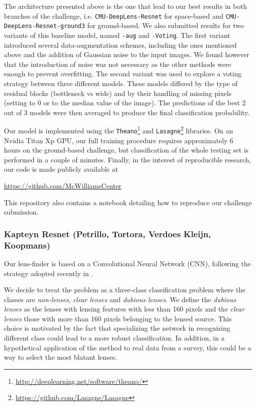 \documentclass[useAMS,usenatbib]{mnras}
\begin{document}
The architecture presented above is the one that lead to our best results in both branches of the challenge, i.e. \texttt{CMU-DeepLens-Resnet} for space-based and \texttt{CMU-DeepLens-Resnet-ground3} for ground-based. We also submitted results for two variants of this baseline model, named \texttt{-aug} and \texttt{-Voting}. 
The first variant introduced several data-augmentation schemes, including the ones mentioned above and the addition of Gaussian noise to the input images. We found however that the introduction of noise was not necessary as the other methods were enough to prevent overfitting. 
The second variant was used to explore a voting strategy between three different models. These models differed by the type of residual blocks (bottleneck vs wide) and by their handling of missing pixels (setting to 0 or to the median value of the image). The predictions of the best 2 out of 3 models were then averaged to produce the final classification probability.

Our model is implemented using the \texttt{Theano}\footnote{\url{http://deeplearning.net/software/theano/}} and \texttt{Lasagne}\footnote{\url{https://github.com/Lasagne/Lasagne}} libraries. On an Nvidia Titan Xp GPU, our full training procedure requires approximately 6 hours on the ground-based challenge, but classification of the whole testing set is performed in a couple of minutes. Finally, in the interest of reproducible research, our code is made publicly available at
\begin{center}
\url{https://github.com/McWilliamsCenter} 
\end{center}
This repository also contains a notebook detailing how to reproduce our challenge submission.

\subsubsection{Kapteyn Resnet (Petrillo, Tortora, Verdoes Kleijn, Koopmans) }
Our lens-finder is based on a Convolutional Neural Network (CNN), following the strategy adopted recently in \citep{2017arXiv170207675P}. 

We decide to treat the problem as a three-class classification problem where the classes are \textit{non-lenses}, \textit{clear lenses} and \textit{dubious lenses}. We define the \textit{dubious lenses} as the lenses with lensing features with less than 160 pixels and the \textit{clear lenses} those with more than 160 pixels belonging to the lensed source. This choice is motivated by the fact that specializing the network in recognizing different class could lead to a more robust classification. In addition, in a hypothetical application of the method to real data from a survey, this could be a way to select the most blatant lenses.  
\end{document}
